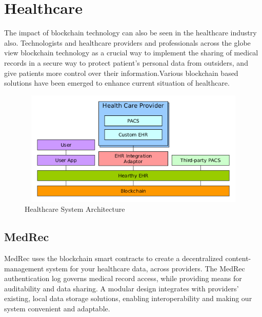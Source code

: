\documentclass[12pt]{report}
\begin{document}
\section{Healthcare}
\par The impact of blockchain technology can also be
seen in the healthcare industry also. Technologists and healthcare providers
and professionals across the globe view blockchain technology as a crucial
way to implement the sharing of medical records in a secure way to protect
patient’s personal data from outsiders, and give patients more control over
their information.Various blockchain based solutions have been emerged to
enhance current situation of healthcare.
\vspace{10cm}

\begin{figure}
    \centering
    \includegraphics[width=14cm,height=5.5cm]{healthcare.png}
    \caption{Healthcare System Architecture}
    \label{fig:my_label}
\end{figure}
\subsection{MedRec}
\par MedRec uses the blockchain smart contracts to  create a decentralized content-management system for your  healthcare  data, across providers. The MedRec authentication log governs medical  record access, while providing means for auditability and data sharing. A  modular design integrates with providers' existing, local data storage  solutions, enabling interoperability and making our system convenient  and adaptable.
\end{document}

